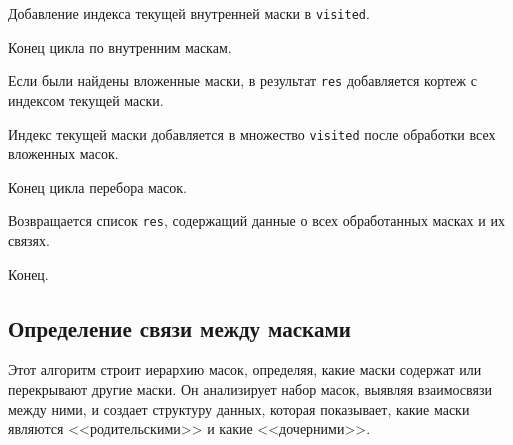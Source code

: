 \begin{enumerate_step}
    \item Добавление индекса текущей внутренней маски в \lstinline{visited}.
    \item Конец цикла по внутренним маскам.
    \item Если были найдены вложенные маски, в результат \lstinline{res} добавляется кортеж с индексом текущей маски.
    \item Индекс текущей маски добавляется в множество \lstinline{visited} после обработки всех вложенных масок.
    \item Конец цикла перебора масок.
    \item Возвращается список \lstinline{res}, содержащий данные о всех обработанных масках и их связях.
    \item Конец.
\end{enumerate_step}

\subsection{Определение связи между масками}

Этот алгоритм строит иерархию масок, определяя, какие маски содержат или перекрывают другие маски. Он анализирует набор масок, выявляя взаимосвязи между ними, и создает структуру данных, которая показывает, какие маски являются <<родительскими>> и какие <<дочерними>>.

